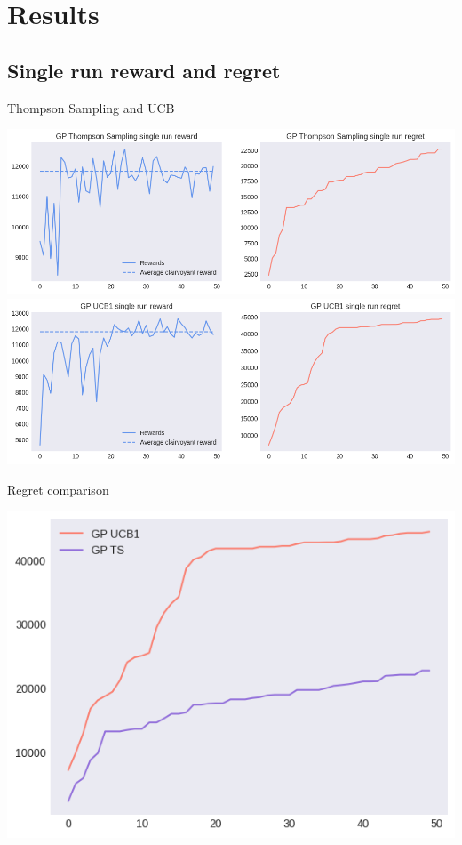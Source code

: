 \section{Results}
\label{sec:unc_a_res}

\subsection{Single run reward and regret}

Thompson Sampling and UCB

\begin{center}
	\includegraphics[scale=0.5]{img/Graphs/uncertain_alpha/image1.png}
	\includegraphics[scale=0.5]{img/Graphs/uncertain_alpha/image2.png}
\end{center}

Regret comparison

\begin{center}
	\includegraphics[scale=0.5]{img/Graphs/uncertain_alpha/image3.png}
\end{center}

